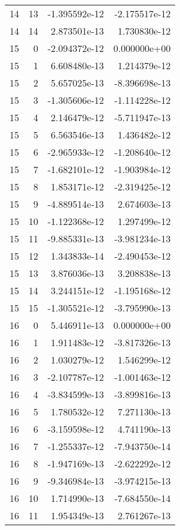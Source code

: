 \begin{tabular}{rrrr}
  14 &   13 & -1.395592e-12 & -2.175517e-12 \\
  14 &   14 &  2.873501e-13 &  1.730830e-12 \\
  15 &    0 & -2.094372e-12 &  0.000000e+00 \\
  15 &    1 &  6.608480e-13 &  1.214379e-12 \\
  15 &    2 &  5.657025e-13 & -8.396698e-13 \\
  15 &    3 & -1.305606e-12 & -1.114228e-12 \\
  15 &    4 &  2.146479e-12 & -5.711947e-13 \\
  15 &    5 &  6.563546e-13 &  1.436482e-12 \\
  15 &    6 & -2.965933e-12 & -1.208640e-12 \\
  15 &    7 & -1.682101e-12 & -1.903984e-12 \\
  15 &    8 &  1.853171e-12 & -2.319425e-12 \\
  15 &    9 & -4.889514e-13 &  2.674603e-13 \\
  15 &   10 & -1.122368e-12 &  1.297499e-12 \\
  15 &   11 & -9.885331e-13 & -3.981234e-13 \\
  15 &   12 &  1.343833e-14 & -2.490453e-12 \\
  15 &   13 &  3.876036e-13 &  3.208838e-13 \\
  15 &   14 &  3.244151e-12 & -1.195168e-12 \\
  15 &   15 & -1.305521e-12 & -3.795990e-13 \\
  16 &    0 &  5.446911e-13 &  0.000000e+00 \\
  16 &    1 &  1.911483e-12 & -3.817326e-13 \\
  16 &    2 &  1.030279e-12 &  1.546299e-12 \\
  16 &    3 & -2.107787e-12 & -1.001463e-12 \\
  16 &    4 & -3.834599e-13 & -3.899816e-13 \\
  16 &    5 &  1.780532e-12 &  7.271130e-13 \\
  16 &    6 & -3.159598e-12 &  4.741190e-13 \\
  16 &    7 & -1.255337e-12 & -7.943750e-14 \\
  16 &    8 & -1.947169e-13 & -2.622292e-12 \\
  16 &    9 & -9.346984e-13 & -3.974215e-13 \\
  16 &   10 &  1.714990e-13 & -7.684550e-14 \\
  16 &   11 &  1.954349e-13 &  2.761267e-13 \\

\end{tabular}
